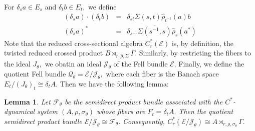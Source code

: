 \documentclass[a4paper,11pt,reqno]{amsart}
\theoremstyle{plain}
\newtheorem{lem}[thm]{Lemma}
\theoremstyle{mainthmstyle}
\theoremstyle{named}
\numberwithin{equation}{section}
\newcommand{\Bea}{\begin{eqnarray*}}
\newcommand{\Eea}{\end{eqnarray*}}
\begin{document}
For $\delta_s a \in E_s$ and $\delta_t b \in E_t,$ we define
\Bea
    (\delta_s a) \cdot (\delta_t b) & = & \delta_{st} \Sigma(s, t) \hat{\rho}_{t^{-1}}(a) b \\
    (\delta_s a)^* & = & \delta_{s^{-1}} \overline{\Sigma(s^{-1}, s)} \hat{\rho}_s(a^*)
\Eea
Note that the reduced cross-sectional algebra $C_r^{\ast}(\mathcal{E})$ is, by definition, the twisted reduced crossed product $B \rtimes_{r, \hat{\rho}, \Sigma} \Gamma.$ Similarly, by restricting the fibers to the ideal $J_{\theta},$ we obatin an ideal $\mathcal{J}_{\theta}$ of the Fell bundle $\mathcal E.$ Finally, we define the quotient Fell bundle $\mathcal{Q}_{\theta} = \mathcal E/ \mathcal J_{\theta},$ where each fiber is the Banach space $E_t/ \left (J_{\theta} \right )_t \cong \delta_t A.$ Then we have the following lemma$:$

\begin{lem}
Let $\mathcal F_{\theta}$ be the semidirect product bundle associated with the $C^{\ast}$-dynamical system $\left (A, \rho, \sigma_{\theta} \right )$ whose fibers are $F_t = \delta_t A.$ Then the quotient semidirect product bundle $\mathcal E/ \mathcal J_{\theta} \cong \mathcal F_{\theta}.$ Consequently, $C_r^{\ast} \left (\mathcal E/ \mathcal J_{\theta} \right ) \cong A \rtimes_{r, \rho, \sigma_{\theta}} \Gamma.$
\end{lem}
\end{document}
